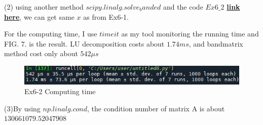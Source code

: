 \documentclass[aps,12pt,prd,nofootinbib,bibnotes, amsmath,amssymb,showpacs,superscriptaddress,floatfix]{revtex4-2}
\begin{document}
(2) using another method $scipy.linalg.solve_banded$ and the code $Ex6 \_ 2$ \href{https://github.com/kuo1235/Computational-Astrophysics-2022/blob/main/astr660/Homework/HW3/EX6/EX6_2.py}{\bf{link here}}, we can get same $x$ as from Ex6-1.

For the computing time, I use $timeit$ as my tool monitoring the running time and FIG. 7. is the result. LU decomposition costs about $1.74ms$, and bandmatrix method cost only about $542 \mu s$ 
\begin{figure}
	\centering
	\includegraphics[width=1.0\textwidth]{EX6_2}
	\caption{Ex6-2 Computing time}
\end{figure}


(3)By using $np.linalg.cond$, the condition number of matrix A is about $130661079.52047908$ 




\end{document}
